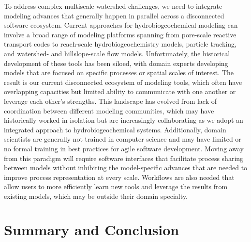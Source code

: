 \documentclass[preprint,review, 12pt]{elsarticle}
\begin{document}

To address complex multiscale watershed challenges, we need to integrate modeling advances that generally happen in parallel across a disconnected software ecosystem. Current approaches for hydrobiogeochemical modeling can involve a broad range of modeling platforms spanning from pore-scale reactive transport codes to reach-scale hydrobiogeochemistry models, particle tracking, and watershed- and hillslope-scale flow models. Unfortunately, the historical development of these tools has been siloed, with domain experts developing models that are focused on specific processes or spatial scales of interest. The result is our current disconnected ecosystem of modeling tools, which often have overlapping capacities but limited ability to communicate with one another or leverage each other’s strengths. This landscape has evolved from lack of coordination between different modeling communities, which may have historically worked in isolation but are increasingly collaborating as we adopt an integrated approach to hydrobiogeochemical systems. Additionally, domain scientists are generally not trained in computer science and may have limited or no formal training in best practices for agile software development. Moving away from this paradigm will require software interfaces that facilitate process sharing between models without inhibiting the model-specific advances that are needed to improve process representation at every scale. Workflows are also needed that allow users to more efficiently learn new tools and leverage the results from existing models, which may be outside their domain specialty.

\section{Summary and Conclusion}
\end{document}
